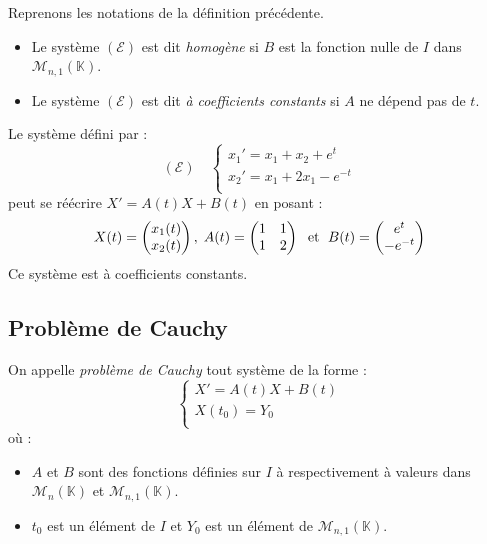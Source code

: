\documentclass[french,11pt,twoside]{VcCours}
\begin{document}
\begin{Definition}{} Reprenons les notations de la définition précédente.

\begin{itemize}
\item Le système $(\mathcal{E})$ est dit \emph{homogène} si $B$ est la fonction nulle de $I$ dans $\mathcal{M}_{n,1}(\mathbb{K})$.
\item Le système $(\mathcal{E})$ est dit \emph{à coefficients constants} si $A$ ne dépend pas de $t$.
\end{itemize}
\end{Definition}

\begin{Exemple} Le système défini par :
$$ (\mathcal{E}) \quad \left\lbrace \begin{array}{lcl}
x_1'=x_1+x_2 + e^t \\
x_2'=x_1+2x_1 - e^{-t} \\
\end{array}\right.$$
peut se réécrire $X'=A(t)X+B(t)$ en posant :
$$ X(t) = \begin{pmatrix}
x_1(t) \\
x_2(t) \\
\end{pmatrix}, \; A(t) = \begin{pmatrix}
1 & 1 \\
1 & 2 \\
\end{pmatrix} \; \hbox{ et } \; B(t) = \begin{pmatrix}
e^t \\
-e^{-t} \\
\end{pmatrix}$$
Ce système est à coefficients constants.
\end{Exemple}

\subsection{Problème de Cauchy}
\begin{Definition}{} On appelle \emph{problème de Cauchy} tout système de la forme :
$$ \left\lbrace \begin{array}{l}
X'=A(t)X+B(t) \\
X(t_0)=Y_0 \\
\end{array}\right.$$
où :
\begin{itemize}
\item $A$ et $B$ sont des fonctions définies sur $I$ à respectivement à valeurs dans $\mathcal{M}_n(\mathbb{K})$ et $\mathcal{M}_{n,1}(\mathbb{K})$.
\item $t_0$ est un élément de $I$ et $Y_0$ est un élément de $\mathcal{M}_{n,1}(\mathbb{K})$.
\end{itemize}
\end{Definition}
\end{document}
